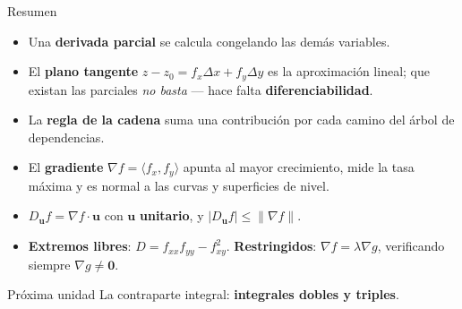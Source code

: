 \documentclass[11pt,aspectratio=169]{beamer}
\begin{document}
\begin{frame}{Resumen}
  \small
  \begin{itemize}
    \setlength{\itemsep}{2pt}
    \item Una \textbf{derivada parcial} se calcula congelando las demás variables.
    \item El \textbf{plano tangente} $z-z_0=f_x\Delta x+f_y\Delta y$ es la aproximación lineal; que existan las parciales \emph{no basta} --- hace falta \textbf{diferenciabilidad}.
    \item La \textbf{regla de la cadena} suma una contribución por cada camino del árbol de dependencias.
    \item El \textbf{gradiente} $\nabla f=\langle f_x,f_y\rangle$ apunta al mayor crecimiento, mide la tasa máxima y es normal a las curvas y superficies de nivel.
    \item $D_{\mathbf u}f=\nabla f\cdot\mathbf u$ con $\mathbf u$ \textbf{unitario}, y $|D_{\mathbf u}f|\le\|\nabla f\|$.
    \item \textbf{Extremos libres}: $D=f_{xx}f_{yy}-f_{xy}^2$. \textbf{Restringidos}: $\nabla f=\lambda\nabla g$, verificando siempre $\nabla g\neq\mathbf 0$.
  \end{itemize}
  \pause
  \begin{block}{Próxima unidad}
    La contraparte integral: \textbf{integrales dobles y triples}.
  \end{block}
\end{frame}
\end{document}
